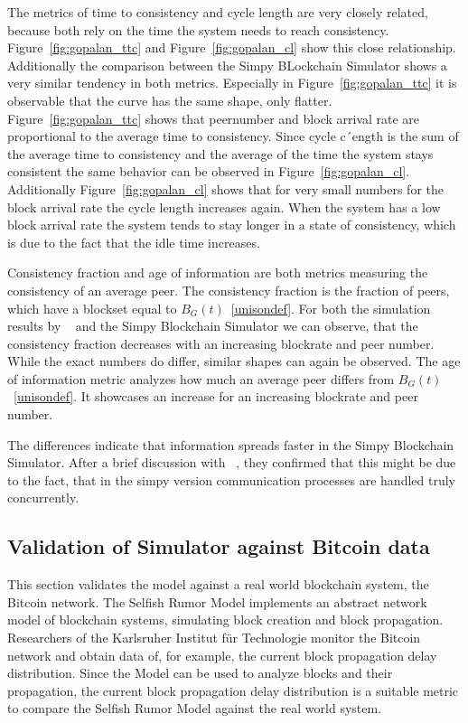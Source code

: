 The metrics of time to consistency and cycle length are very closely related, because both rely on the time the system needs to reach consistency.
Figure~\ref{fig:gopalan_ttc} and Figure~\ref{fig:gopalan_cl} show this close relationship. Additionally the comparison between the Simpy BLockchain Simulator shows a very similar tendency in both metrics. Especially in Figure~\ref{fig:gopalan_ttc} it is observable that the curve has the same shape, only flatter. Figure~\ref{fig:gopalan_ttc} shows that peernumber and block arrival rate are proportional to the average time to consistency. Since cycle c´ength is the sum of the average time to consistency and the average of the time the system stays consistent the same behavior can be observed in Figure~\ref{fig:gopalan_cl}. Additionally Figure~\ref{fig:gopalan_cl} shows that for very small numbers for the block arrival rate the cycle length increases again. When the system has a low block arrival rate the system tends to stay longer in a state of consistency, which is due to the fact that the idle time increases.

Consistency fraction and age of information are both metrics measuring the consistency of an average peer. The consistency fraction is the fraction of peers, which have a blockset equal to $B_G(t)$~\ref{unisondef}. For both the simulation results by \gopalan~ and the Simpy Blockchain Simulator we can observe, that the consistency fraction decreases with an increasing blockrate and peer number. While the exact numbers do differ, similar shapes can again be observed.
The age of information metric analyzes how much an average peer differs from $B_G(t)$~\ref{unisondef}. It showcases an increase for an increasing blockrate and peer number.

The differences indicate that information spreads faster in the Simpy Blockchain Simulator. After a brief discussion with \gopalan~, they confirmed that this might be due to the fact, that in the simpy version communication processes are handled truly concurrently.	

\subsection{Validation of Simulator against Bitcoin data}
This section validates the model against a real world blockchain system, the Bitcoin network. The Selfish Rumor Model implements an abstract network model of blockchain systems, simulating block creation and block propagation.
Researchers of the Karlsruher Institut für Technologie \cite{BitcoinNetworkMonitor} monitor the Bitcoin network and obtain data of, for example, the current block propagation delay distribution. Since the Model can be used to analyze blocks and their propagation, the current block propagation delay distribution is a suitable metric to compare the Selfish Rumor Model against the real world system.

